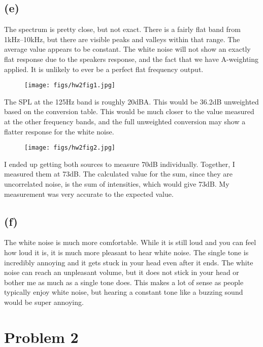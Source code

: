 \documentclass[12 pt]{article}
\begin{document}
\subsection*{(e)}
The spectrum is pretty close, but not exact. There is a fairly flat band from 1kHz--10kHz, but there are visible peaks
and valleys within that range. The average value appears to be constant. The white noise will not show an exactly flat
response due to the speakers response, and the fact that we have A-weighting applied. It is unlikely to ever be a
perfect flat frequency output.
\begin{figure}[H]
    \centering
    \texttt{[image: figs/hw2fig1.jpg]}
\end{figure} \par
The SPL at the 125Hz band is roughly 20dBA. This would be 36.2dB unweighted based on the conversion table. This would be
much closer to the value measured at the other frequency bands, and the full unweighted conversion may show a flatter
response for the white noise.
\begin{figure}[H]
    \centering
    \texttt{[image: figs/hw2fig2.jpg]}
\end{figure} \par
I ended up getting both sources to measure 70dB individually. Together, I measured them at 73dB. The calculated value
for the sum, since they are uncorrelated noise, is the sum of intensities, which would give 73dB. My measurement was
very accurate to the expected value.

\subsection*{(f)}
The white noise is much more comfortable. While it is still loud and you can feel how loud it is, it is much more
pleasant to hear white noise. The single tone is incredibly annoying and it gets stuck in your head even after it ends.
The white noise can reach an unpleasant volume, but it does not stick in your head or bother me as much as a single tone
does. This makes a lot of sense as people typically enjoy white noise, but hearing a constant tone like a buzzing sound
would be super annoying.

\section*{Problem 2}
\end{document}
